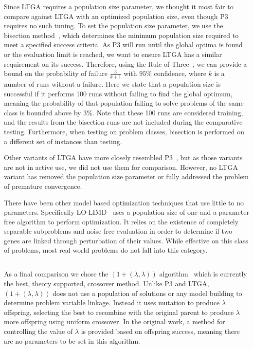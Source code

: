 \documentclass{sig-alternate}
\begin{document}
Since LTGA requires a population size parameter, we thought it most fair to
compare against LTGA with an optimized population size, even though P3
requires no such tuning. To set the population size parameter, we use
the bisection method~\cite{goldman:2012:ltga}, which determines the minimum population
size required to meet a specified success criteria.  As P3 will run until the global optima
is found or the evaluation limit is reached, we want to ensure LTGA has a similar requirement
on its success.  Therefore, using the Rule of Three~\cite{jovanovic:1997:ruleofthree}, we
can provide a bound on the probability of failure $\frac{3}{k+1}$ with $95\%$ confidence,
where $k$ is a number of runs without a failure.  Here we state that a population size
is successful if it performs 100 runs without failing to find the global optimum, meaning
the probability of that population failing to solve problems of the same class is bounded above by
$3\%$.  Note that these 100 runs are considered training, and the results from the bisection
runs are not included during the comparative testing.  Furthermore, when testing on problem
classes, bisection is performed on a different set of instances than testing.

Other variants of LTGA have more closely resembled P3~\cite{goldman:2012:ltga},
but as those variants are not in active use, we did not use them for comparison.
However, no LTGA variant has removed the population size parameter
or fully addressed the problem of premature convergence.

There have been other model based optimization techniques that use little to
no parameters.  Specifically LO-LIMD~\cite{posik:2011:parameterless} uses a
population size of one and a parameter free algorithm to perform optimization.
It relies on the existence of completely separable subproblems and noise free evaluation in order to determine
if two genes are linked through perturbation of their values.  While effective on
this class of problems, most real world problems do not fall into this category.

\subsection{}
As a final comparison we chose the $(1+(\lambda,\lambda))$ algorithm~\cite{doerr:2013:lambdalambda}
which is currently the best, theory supported, crossover method.  Unlike P3 and LTGA,
$(1+(\lambda,\lambda))$ does not use a population of solutions or any model building
to determine problem variable linkage.  Instead it uses mutation to produce $\lambda$
offspring, selecting the best to recombine with the original parent to produce $\lambda$
more offspring using uniform crossover.  In the original work, a method for controlling
the value of $\lambda$ is provided based on offspring success, meaning there are no
parameters to be set in this algorithm.
\end{document}

